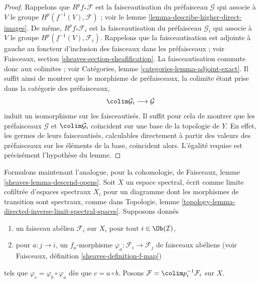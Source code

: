 \begin{proof}

Rappelons que $R^pf_*\mathcal{F}$ est la faisceautisation du préfaisceau
$\mathcal{G}$ qui associe à $V$ le groupe $H^p(f^{-1}(V), \mathcal{F})$ ; voir le lemme \ref{lemma-describe-higher-direct-images}. De même, 
$R^pf_*\mathcal{F}_i$ est la faisceautisation du préfaisceau
$\mathcal{G}_i$ qui associe à $V$ le groupe $H^p(f^{-1}(V), \mathcal{F}_i)$. Rappelons que la faisceautisation est adjointe à gauche au foncteur d'inclusion des faisceaux dans les préfaisceaux ; voir Faisceaux, section
\ref{sheaves-section-sheafification}. La faisceautisation commute donc aux colimites ; voir Catégories, lemme \ref{categories-lemma-adjoint-exact}. Il suffit ainsi de montrer que le morphisme de préfaisceaux, la colimite étant prise dans la catégorie des préfaisceaux,
$$
\colim \mathcal{G}_i \longrightarrow \mathcal{G}
$$
induit un isomorphisme sur les faisceautisés. Il suffit pour cela de montrer que les préfaisceaux $\mathcal{G}$ et $\colim \mathcal{G}_i$
coïncident sur une base de la topologie de $Y$. En effet, les germes de leurs faisceautisés, calculables directement à partir des valeurs des préfaisceaux sur les éléments de la base, coïncident alors. L'égalité requise est précisément l'hypothèse du lemme.

\end{proof}

\noindent

Formulons maintenant l'analogue, pour la cohomologie, de Faisceaux, lemme \ref{sheaves-lemma-descend-opens}.
Soit $X$ un espace spectral, écrit comme limite cofiltrée d'espaces spectraux $X_i$ pour un diagramme dont les morphismes de transition sont spectraux, comme dans Topologie, lemme \ref{topology-lemma-directed-inverse-limit-spectral-spaces}. Supposons donnés

\begin{enumerate}

\item un faisceau abélien $\mathcal{F}_i$ sur $X_i$ pour tout
$i \in \Ob(\mathcal{I})$,
\item pour $a : j \to i$, un $f_a$-morphisme
$\varphi_a : \mathcal{F}_i \to \mathcal{F}_j$ de faisceaux abéliens (voir Faisceaux, définition \ref{sheaves-definition-f-map})

\end{enumerate}

tels que $\varphi_c = \varphi_b \circ \varphi_a$
dès que $c = a \circ b$. Posons $\mathcal{F} = \colim p_i^{-1}\mathcal{F}_i$
sur $X$.

